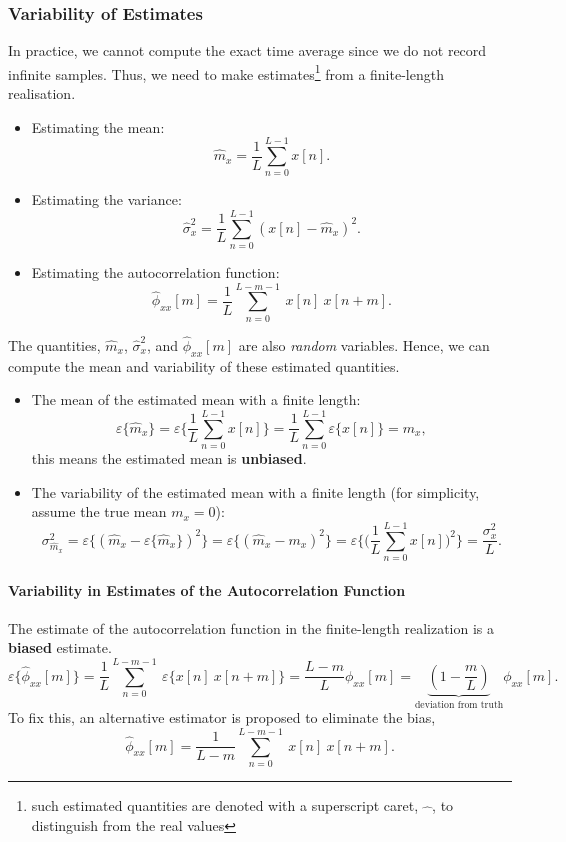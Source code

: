 \subsubsection{Variability of Estimates}
In practice, we cannot compute the exact time average since we do not record infinite samples. Thus, we need to make estimates\footnote{such estimated quantities are denoted with a superscript caret, $\widehat{\text{ }}$, to distinguish from the real values} from a finite-length realisation.
\begin{itemize}
    \item Estimating the mean:
    \[
        \widehat{m}_{x} = \frac{1}{L} \sum_{n=0}^{L-1} x[n].
    \]

    \item Estimating the variance:
    \[
        \widehat{\sigma}_x^2 = \frac{1}{L} \sum_{n=0}^{L-1} (x[n] - \widehat{m}_{x})^2.
    \]

    \item Estimating the autocorrelation function:
    \[
        \widehat{\phi}_{xx}[m] = \frac{1}{L}\sum_{n=0}^{L-m-1} \ x[n] \ x[n+m].
    \]
\end{itemize}
The quantities, $\widehat{m}_{x}$, $\widehat{\sigma}_x^2$, and $\widehat{\phi}_{xx}[m]$ are also \textit{random} variables. Hence, we can compute the mean and variability of these estimated quantities. 

\begin{itemize}
    \item The mean of the estimated mean with a finite length:
    \[
        \varepsilon\{\widehat{m}_{x}\} = \varepsilon\bigg\{\frac{1}{L} \sum_{n=0}^{L-1} x[n] \bigg\} = \frac{1}{L} \sum_{n=0}^{L-1} \varepsilon\{x[n]\} = m_x,
    \]
    this means the estimated mean is \textbf{unbiased}.

    \item The variability of the estimated mean with a finite length (for simplicity, assume the true mean $m_x = 0$):
    \[
        \sigma_{\widehat{m}_{x}}^2 = \varepsilon\{(\widehat{m}_{x} - \varepsilon\{\widehat{m}_{x}\})^2\} =  \varepsilon\{(\widehat{m}_{x} - m_x)^2\} = \varepsilon \bigg\{\bigg(\frac{1}{L} \sum_{n=0}^{L-1} x[n]\bigg)^2\bigg\} = \frac{\sigma_x^2}{L}.
    \]
\end{itemize}

\paragraph{Variability in Estimates of the Autocorrelation Function} The estimate of the autocorrelation function in the finite-length realization is a \textbf{biased} estimate.
\[
    \varepsilon\{\widehat{\phi}_{xx}[m]\} = \frac{1}{L}\sum_{n=0}^{L-m-1} \ \varepsilon\{x[n] \ x[n+m] \} = \frac{L-m}{L} \phi_{xx}[m] = \underbrace{(1-\frac{m}{L})}_{\text{deviation from truth}}\phi_{xx}[m].
\]
To fix this, an alternative estimator is proposed to eliminate the bias,
\[
    \widehat{\phi}_{xx}[m] = \frac{1}{L-m}\sum_{n=0}^{L-m-1} \ x[n] \ x[n+m].
\]

